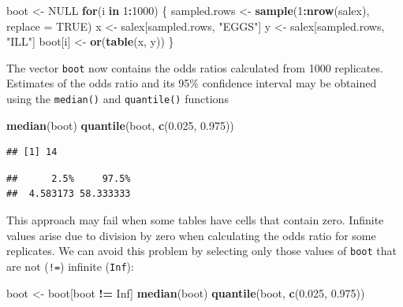 \documentclass[12pt,a4paper]{book}
\newenvironment{Shaded}{\begin{snugshade}}{\end{snugshade}}
\newcommand{\ControlFlowTok}[1]{\textcolor[rgb]{0.13,0.29,0.53}{\textbf{#1}}}
\newcommand{\DataTypeTok}[1]{\textcolor[rgb]{0.13,0.29,0.53}{#1}}
\newcommand{\DecValTok}[1]{\textcolor[rgb]{0.00,0.00,0.81}{#1}}
\newcommand{\FloatTok}[1]{\textcolor[rgb]{0.00,0.00,0.81}{#1}}
\newcommand{\KeywordTok}[1]{\textcolor[rgb]{0.13,0.29,0.53}{\textbf{#1}}}
\newcommand{\NormalTok}[1]{#1}
\newcommand{\OperatorTok}[1]{\textcolor[rgb]{0.81,0.36,0.00}{\textbf{#1}}}
\newcommand{\OtherTok}[1]{\textcolor[rgb]{0.56,0.35,0.01}{#1}}
\newcommand{\StringTok}[1]{\textcolor[rgb]{0.31,0.60,0.02}{#1}}
\theoremstyle{definition}
\theoremstyle{definition}
\theoremstyle{definition}
\theoremstyle{remark}
\begin{document}
\begin{Shaded}
\begin{Highlighting}[]
\NormalTok{boot <-}\StringTok{ }\OtherTok{NULL}
\ControlFlowTok{for}\NormalTok{(i }\ControlFlowTok{in} \DecValTok{1}\OperatorTok{:}\DecValTok{1000}\NormalTok{) \{}
\NormalTok{  sampled.rows <-}\StringTok{ }\KeywordTok{sample}\NormalTok{(}\DecValTok{1}\OperatorTok{:}\KeywordTok{nrow}\NormalTok{(salex), }\DataTypeTok{replace =} \OtherTok{TRUE}\NormalTok{)}
\NormalTok{  x <-}\StringTok{ }\NormalTok{salex[sampled.rows, }\StringTok{"EGGS"}\NormalTok{]}
\NormalTok{  y <-}\StringTok{ }\NormalTok{salex[sampled.rows, }\StringTok{"ILL"}\NormalTok{]}
\NormalTok{  boot[i] <-}\StringTok{ }\KeywordTok{or}\NormalTok{(}\KeywordTok{table}\NormalTok{(x, y))}
\NormalTok{\}}
\end{Highlighting}
\end{Shaded}

The vector \texttt{boot} now contains the odds ratios calculated from
1000 replicates. Estimates of the odds ratio and its 95\% confidence
interval may be obtained using the \texttt{median()} and
\texttt{quantile()} functions

\begin{Shaded}
\begin{Highlighting}[]
\KeywordTok{median}\NormalTok{(boot)}
\KeywordTok{quantile}\NormalTok{(boot, }\KeywordTok{c}\NormalTok{(}\FloatTok{0.025}\NormalTok{, }\FloatTok{0.975}\NormalTok{))}
\end{Highlighting}
\end{Shaded}

\begin{verbatim}
## [1] 14
\end{verbatim}

\begin{verbatim}
##      2.5%     97.5% 
##  4.583173 58.333333
\end{verbatim}

This approach may fail when some tables have cells that contain zero.
Infinite values arise due to division by zero when calculating the odds
ratio for some replicates. We can avoid this problem by selecting only
those values of \texttt{boot} that are not (\texttt{!=}) infinite
(\texttt{Inf}):

\begin{Shaded}
\begin{Highlighting}[]
\NormalTok{boot <-}\StringTok{ }\NormalTok{boot[boot }\OperatorTok{!=}\StringTok{ }\OtherTok{Inf}\NormalTok{]}
\KeywordTok{median}\NormalTok{(boot)}
\KeywordTok{quantile}\NormalTok{(boot, }\KeywordTok{c}\NormalTok{(}\FloatTok{0.025}\NormalTok{, }\FloatTok{0.975}\NormalTok{))}
\end{Highlighting}
\end{Shaded}
\end{document}
